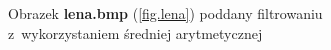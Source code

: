 \documentclass{classrep}
\begin{document}
\begin{figure}
{{  \label{fig.lena_average_5x5}
 }
}
\caption{Obrazek \textbf{lena.bmp} (\ref{fig.lena}) poddany filtrowaniu z~wykorzystaniem średniej arytmetycznej}
\label{fig.lena_average}
\end{figure}

\end{document}
